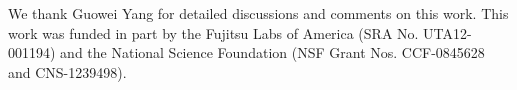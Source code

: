 \documentclass[times,doublespace]{stvrauth}%
\begin{document}

\maketitle
{}

\setcounter{footnote}{0}









\ack We thank Guowei Yang for detailed discussions and comments on this work. 
This work was funded in part by the Fujitsu Labs of America (SRA No. UTA12-001194) and the National Science Foundation (NSF Grant Nos. CCF-0845628 and CNS-1239498).



\end{document}
